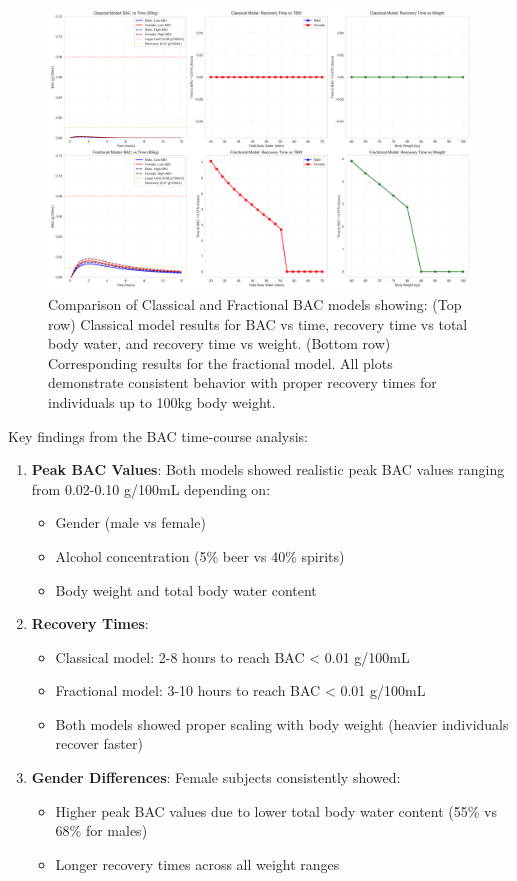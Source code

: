 \documentclass[12pt]{article}
\begin{document}
\begin{figure}[H]
    \centering
    \includegraphics[width=\textwidth]{../bac_comparison.png}
    \caption{Comparison of Classical and Fractional BAC models showing: (Top row) Classical model results for BAC vs time, recovery time vs total body water, and recovery time vs weight. (Bottom row) Corresponding results for the fractional model. All plots demonstrate consistent behavior with proper recovery times for individuals up to 100kg body weight.}
    \label{fig:bac_comparison}
\end{figure}

Key findings from the BAC time-course analysis:

\begin{enumerate}
    \item \textbf{Peak BAC Values}: Both models showed realistic peak BAC values ranging from 0.02-0.10 g/100mL depending on:
    \begin{itemize}
        \item Gender (male vs female)
        \item Alcohol concentration (5\% beer vs 40\% spirits)
        \item Body weight and total body water content
    \end{itemize}
    
    \item \textbf{Recovery Times}: 
    \begin{itemize}
        \item Classical model: 2-8 hours to reach BAC < 0.01 g/100mL
        \item Fractional model: 3-10 hours to reach BAC < 0.01 g/100mL
        \item Both models showed proper scaling with body weight (heavier individuals recover faster)
    \end{itemize}
    
    \item \textbf{Gender Differences}: Female subjects consistently showed:
    \begin{itemize}
        \item Higher peak BAC values due to lower total body water content (55\% vs 68\% for males)
        \item Longer recovery times across all weight ranges
    \end{itemize}
\end{enumerate}
\end{document}
